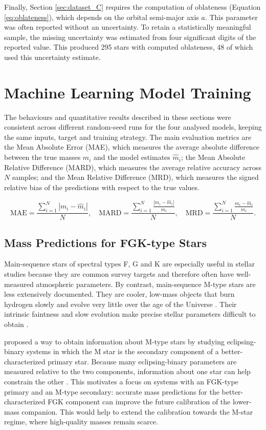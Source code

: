 Finally, Section \ref{sec:dataset_C} requires the computation of oblateness (Equation \ref{eq:oblateness}), which depends on the orbital semi-major axis $a$. This parameter was often reported without an uncertainty. To retain a statistically meaningful sample, the missing uncertainty was estimated from four significant digits of the reported value. This produced 295 stars with computed oblateness, 48 of which used this uncertainty estimate.



\section{Machine Learning Model Training} \label{sec:results}
The behaviours and quantitative results described in these sections were consistent across different random-seed runs for the four analysed models, keeping the same inputs, target and training strategy. The main evaluation metrics are the Mean Absolute Error (MAE), which measures the average absolute difference between the true masses $m_i$ and the model estimates $\hat{m}_i$; the Mean Absolute Relative Difference (MARD), which measures the average relative accuracy across $N$ samples; and the Mean Relative Difference (MRD), which measures the signed relative bias of the predictions with respect to the true values.

\begin{equation}
\text{MAE} = \frac{\sum_{i=1}^N |m_i - \hat{m}_i|}{N}, \quad \text{MARD} = \frac{\sum_{i=1}^N \frac{|m_i - \hat{m}_i|}{m_i}}{N}, \quad \text{MRD} = \frac{\sum_{i=1}^N \frac{m_i - \hat{m}_i}{m_i}}{N}.
\label{eq:metrics}
\end{equation}

\subsection{Mass Predictions for FGK-type Stars} \label{subsec:dataset_a}
Main-sequence stars of spectral types F, G and K are especially useful in stellar studies because they are common survey targets and therefore often have well-measured atmospheric parameters. By contrast, main-sequence M-type stars are less extensively documented. They are cooler, low-mass objects that burn hydrogen slowly and evolve very little over the age of the Universe \citep{laughlin1997}. Their intrinsic faintness and slow evolution make precise stellar parameters difficult to obtain \citep{chabrier2000}.

\citet{maxted2023benchmark} proposed a way to obtain information about M-type stars by studying eclipsing-binary systems in which the M star is the secondary component of a better-characterized primary star. Because many eclipsing-binary parameters are measured relative to the two components, information about one star can help constrain the other \citep{Southworth2015}. This motivates a focus on systems with an FGK-type primary and an M-type secondary: accurate mass predictions for the better-characterized FGK component can improve the future calibration of the lower-mass companion. This would help to extend the calibration towards the M-star regime, where high-quality masses remain scarce.

